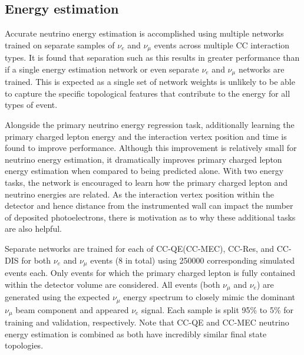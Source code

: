 \subsection{Energy estimation} %
\label{sec:cvn_specific_energy} %

Accurate neutrino energy estimation is accomplished using multiple networks trained on separate
samples of $\nu_{e}$ and $\nu_{\mu}$ events across multiple CC interaction types. It is found that
separation such as this results in greater performance than if a single energy estimation network
or even separate $\nu_{e}$ and $\nu_{\mu}$ networks are trained. This is expected as a single set
of network weights is unlikely to be able to capture the specific topological features that
contribute to the energy for all types of event.

Alongside the primary neutrino energy regression task, additionally learning the primary charged
lepton energy and the interaction vertex position and time is found to improve performance.
Although this improvement is relatively small for neutrino energy estimation, it dramatically
improves primary charged lepton energy estimation when compared to being predicted alone. With two
energy tasks, the network is encouraged to learn how the primary charged lepton and neutrino
energies are related. As the interaction vertex position within the detector and hence distance
from the instrumented wall can impact the number of deposited photoelectrons, there is motivation
as to why these additional tasks are also helpful.

Separate networks are trained for each of CC-QE(CC-MEC), CC-Res, and CC-DIS for both $\nu_{e}$ and
$\nu_{\mu}$ events (8 in total) using 250000 corresponding simulated events each. Only events for
which the primary charged lepton is fully contained within the detector volume are considered. All
events (both $\nu_{\mu}$ and $\nu_{e}$) are generated using the expected \chips $\nu_{\mu}$ energy
spectrum to closely mimic the dominant $\nu_{\mu}$ beam component and appeared $\nu_{e}$ signal.
Each sample is split 95\% to 5\% for training and validation, respectively. Note that CC-QE and
CC-MEC neutrino energy estimation is combined as both have incredibly similar final state
topologies.


